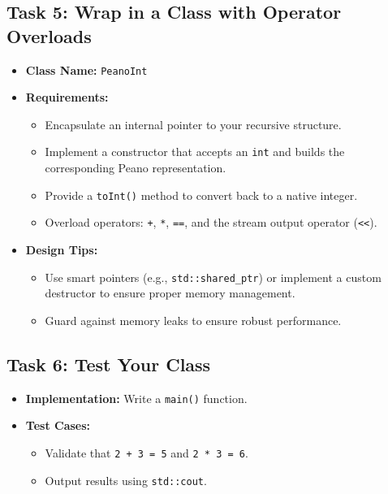 \documentclass[12pt]{article}
\begin{document}
\subsection*{Task 5: Wrap in a Class with Operator Overloads}
\begin{itemize}[leftmargin=*]
    \item \textbf{Class Name:} \texttt{PeanoInt}
    \item \textbf{Requirements:}
    \begin{itemize}
        \item Encapsulate an internal pointer to your recursive structure.
        \item Implement a constructor that accepts an \texttt{int} and builds the corresponding Peano representation.
        \item Provide a \texttt{toInt()} method to convert back to a native integer.
        \item Overload operators: \texttt{+}, \texttt{*}, \texttt{==}, and the stream output operator (\texttt{\textless\textless}).
    \end{itemize}
    \item \textbf{Design Tips:}
    \begin{itemize}
        \item Use smart pointers (e.g., \texttt{std::shared\_ptr}) or implement a custom destructor to ensure proper memory management.
        \item Guard against memory leaks to ensure robust performance.
    \end{itemize}
\end{itemize}

\subsection*{Task 6: Test Your Class}
\begin{itemize}[leftmargin=*]
    \item \textbf{Implementation:} Write a \texttt{main()} function.
    \item \textbf{Test Cases:}
    \begin{itemize}
        \item Validate that \texttt{2 + 3 = 5} and \texttt{2 * 3 = 6}.
        \item Output results using \texttt{std::cout}.
    \end{itemize}
\end{itemize}
\end{document}
